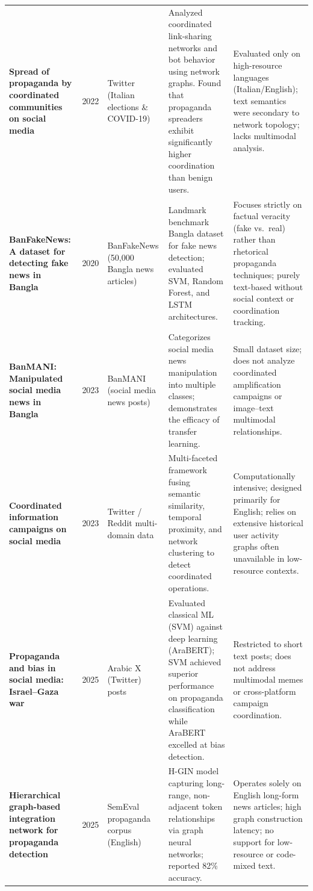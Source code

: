 \begin{longtable}{@{}L{3.1cm}C{0.8cm}L{2.2cm}L{3.5cm}L{3.3cm}@{}}
\textbf{Spread of propaganda by coordinated communities on social media}~\cite{hristakieva2022} & 2022 & Twitter (Italian elections \& COVID-19) &
Analyzed coordinated link-sharing networks and bot behavior using network graphs. Found that propaganda spreaders exhibit significantly higher coordination than benign users. &
Evaluated only on high-resource languages (Italian/English); text semantics were secondary to network topology; lacks multimodal analysis.\\
\addlinespace
\textbf{BanFakeNews: A dataset for detecting fake news in Bangla}~\cite{hossain2020} & 2020 & BanFakeNews (50,000 Bangla news articles) &
Landmark benchmark Bangla dataset for fake news detection; evaluated SVM, Random Forest, and LSTM architectures. &
Focuses strictly on factual veracity (fake vs.\ real) rather than rhetorical propaganda techniques; purely text-based without social context or coordination tracking.\\
\addlinespace
\textbf{BanMANI: Manipulated social media news in Bangla}~\cite{kamruzzaman2023} & 2023 & BanMANI (social media news posts) &
Categorizes social media news manipulation into multiple classes; demonstrates the efficacy of transfer learning. &
Small dataset size; does not analyze coordinated amplification campaigns or image--text multimodal relationships.\\
\addlinespace
\textbf{Coordinated information campaigns on social media}~\cite{ng2023} & 2023 & Twitter / Reddit multi-domain data &
Multi-faceted framework fusing semantic similarity, temporal proximity, and network clustering to detect coordinated operations. &
Computationally intensive; designed primarily for English; relies on extensive historical user activity graphs often unavailable in low-resource contexts.\\
\addlinespace
\textbf{Propaganda and bias in social media: Israel--Gaza war}~\cite{duridi2025} & 2025 & Arabic X (Twitter) posts &
Evaluated classical ML (SVM) against deep learning (AraBERT); SVM achieved superior performance on propaganda classification while AraBERT excelled at bias detection. &
Restricted to short text posts; does not address multimodal memes or cross-platform campaign coordination.\\
\addlinespace
\textbf{Hierarchical graph-based integration network for propaganda detection}~\cite{ahmad2025} & 2025 & SemEval propaganda corpus (English) &
H-GIN model capturing long-range, non-adjacent token relationships via graph neural networks; reported 82\% accuracy. &
Operates solely on English long-form news articles; high graph construction latency; no support for low-resource or code-mixed text.\\

\end{longtable}
